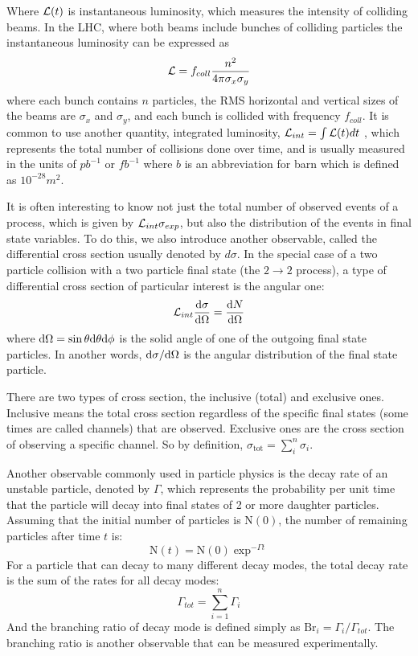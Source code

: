 Where $\mathcal{L}(t)$ is instantaneous luminosity, which measures the intensity of colliding beams. In the LHC, where both beams include bunches of colliding particles the instantaneous luminosity can be expressed as
\begin{equation}
\mathcal{L} = f_{coll}\frac{n^2}{4\pi \sigma_x \sigma_y}
\end{equation}
where each bunch contains $n$ particles, the RMS horizontal and vertical sizes of the beams are $\sigma_x$ and $\sigma_y$, and each bunch is collided with frequency $f_{coll}$.  It is common to use another quantity, integrated luminosity, $\mathcal{L}_{int} = \int \mathcal{L}(t)dt$ , which represents the total number of collisions done over time, and is usually measured in the units of $pb^{-1}$ or $fb^{-1}$ where $b$ is an abbreviation for barn which is defined as $10^{-28}m^2$.
 
 It is often interesting to know not just the total number of observed events of a process, which is given by $\mathcal{L}_{int}\sigma_{exp}$, but also the distribution of the events in final state variables. To do this, we also introduce another observable, called the differential cross section usually denoted by $d\sigma$. In the special case of a two particle collision with a two particle final state (the $2\rightarrow2$ process), a type of differential cross section of particular interest is the angular one:
 \begin{equation}
 \mathcal{L}_{int}\frac{\mathrm{d}\sigma}{\mathrm{d}\Omega}=\frac{\mathrm{d} N}{\mathrm{d} \Omega}
 \end{equation} 
 where $\mathrm{d} \Omega=\sin\theta\mathrm{d}\theta\mathrm{d} \phi$ is the solid angle of one of the outgoing final state particles. In another words, $\mathrm{d} \sigma/\mathrm{d} \Omega$ is the angular distribution of the final state particle.
 
 There are two types of cross section, the inclusive (total) and exclusive ones. Inclusive means the total cross section regardless of the specific final states (some times are called channels) that are observed. Exclusive ones are the cross section of observing a specific channel. So by definition, $\sigma_{\mathrm{tot}}=\sum_{i}^{n}\sigma_i$.
 
Another observable commonly used in particle physics is the decay rate of an unstable particle, denoted by $\Gamma$, which represents the probability per unit time that the particle will decay into final states of 2 or more daughter particles. Assuming that the initial number of particles is $\mathrm{N}(0)$, the number of remaining particles after time $t$ is:
 \begin{equation}
 \mathrm{N}(t) = \mathrm{N}(0)\exp^{-\Gamma t}
 \end{equation}
 For a particle that can decay to many different decay modes, the total decay rate is the sum of the rates for all decay modes:
 \begin{equation}
 \Gamma_{tot} = \sum_{i=1}^{n}\Gamma_i
 \end{equation}
 And the branching ratio of decay mode is defined simply as $\mathrm{Br}_i = \Gamma_i/\Gamma_{tot} $. The branching ratio is another observable that can be measured experimentally.

